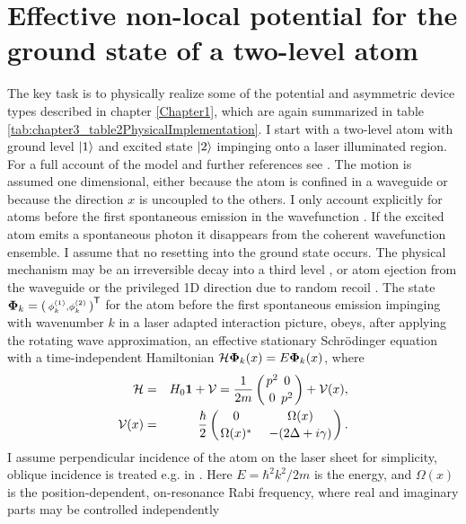 \section{Effective non-local potential for the ground state of a two-level atom\label{sec:chapter3_enl}}
%
The key task is to physically realize some of the potential and asymmetric device types described in chapter \ref{Chapter1}, which are again summarized in table \ref{tab:chapter3_table2PhysicalImplementation}. I start with a two-level atom with ground level $\ket{1}$ and excited state $\ket{2}$ impinging onto a laser illuminated region. For a full account of the model and further references see
\cite{Ruschhaupt2009}. The motion is assumed one dimensional, either because the atom is confined in a waveguide or because the direction $x$ is uncoupled to
the others.
I only account explicitly for atoms before the first spontaneous emission in the wavefunction
\cite{Hegerfeldt1996,Damborenea2002,Navarro2003}.
If the excited atom emits a spontaneous photon it disappears from the coherent wavefunction ensemble.
I assume that no resetting into the ground state occurs. The physical mechanism
may be an irreversible decay into a third level  \cite{Oberthaler1996}, or atom ejection from the waveguide or the privileged 1D direction due to  random recoil  \cite{Streed2006}.
The state ${\bf\Phi}_k=\left(\begin{smallmatrix}\phi_k^{(1)},\phi_k^{(2)}\end{smallmatrix}\right)^{\sf T}$
for the atom before the first spontaneous emission impinging with wavenumber $k$
in a laser adapted  interaction picture,
obeys, after applying the rotating wave approximation, an effective stationary Schr\"{o}dinger equation
with a time-independent Hamiltonian \cite{Ruschhaupt2004a,Ruschhaupt2009}
%
${\cal H}{\bf\Phi}_k(x)=E{\bf\Phi}_k(x)$,
%
where
%
\begin{eqnarray}
  {\cal H}&=& H_0{\bf 1}+ {\cal V}=\frac{1}{2m}\left(
  {{p}^2\atop 0}{0\atop {p}^2}\right)+ {\cal V}(x),
  \\
  {\cal V}(x) &=&
  \frac{\hbar}{2}\left(
  {0\atop \Omega(x)^*}\;\;\;\;
  {\Omega(x)\atop -(2\Delta+i\gamma)}
  \right).
\end{eqnarray}
%
I assume perpendicular incidence of the atom on the laser sheet for simplicity, oblique incidence is treated e.g. in  \cite{Ruschhaupt2007,Ruschhaupt2009}.
Here $E=\hbar^2 k^2/2m$ is the energy, and
$\Omega(x)$ is the position-dependent, on-resonance Rabi frequency, where real and imaginary parts may be controlled independently
